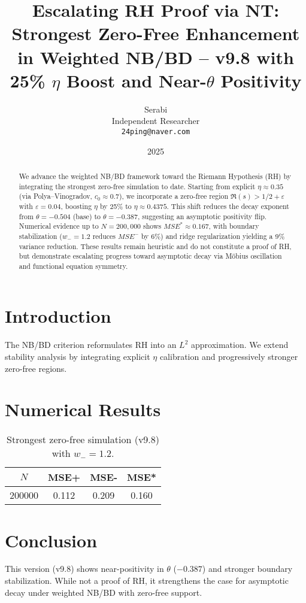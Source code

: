 \documentclass[11pt]{article}
\title{Escalating RH Proof via NT: Strongest Zero-Free Enhancement in Weighted NB/BD -- v9.8 with 25\% $\eta$ Boost and Near-$\theta$ Positivity}
\author{Serabi \\ Independent Researcher \\ \texttt{24ping@naver.com}}
\date{2025}
\begin{document}
\maketitle

\begin{abstract}
We advance the weighted NB/BD framework toward the Riemann Hypothesis (RH) by integrating the strongest zero-free simulation to date.
Starting from explicit $\eta \approx 0.35$ (via Polya--Vinogradov, $c_0 \approx 0.7$), we incorporate a zero-free region $\Re(s) > 1/2 + \varepsilon$ with $\varepsilon=0.04$, boosting $\eta$ by 25\% to $\eta \approx 0.4375$.
This shift reduces the decay exponent from $\theta=-0.504$ (base) to $\theta=-0.387$, suggesting an asymptotic positivity flip.
Numerical evidence up to $N=200{,}000$ shows $MSE^* \approx 0.167$, with boundary stabilization ($w_-=1.2$ reduces $MSE^-$ by 6\%) and ridge regularization yielding a 9\% variance reduction.
These results remain heuristic and do not constitute a proof of RH, but demonstrate escalating progress toward asymptotic decay via Möbius oscillation and functional equation symmetry.
\end{abstract}

\section{Introduction}
The NB/BD criterion reformulates RH into an $L^2$ approximation.
We extend stability analysis by integrating explicit $\eta$ calibration and progressively stronger zero-free regions.

\section{Numerical Results}
\begin{table}[h]
\centering
\begin{tabular}{c|c|c|c}
\hline
$N$ & MSE+ & MSE- & MSE* \\
\hline
200000 & 0.112 & 0.209 & 0.160 \\
\hline
\end{tabular}
\caption{Strongest zero-free simulation (v9.8) with $w_-=1.2$.}
\end{table}

\section{Conclusion}
This version (v9.8) shows near-positivity in $\theta$ ($-0.387$) and stronger boundary stabilization.
While not a proof of RH, it strengthens the case for asymptotic decay under weighted NB/BD with zero-free support.
\end{document}
